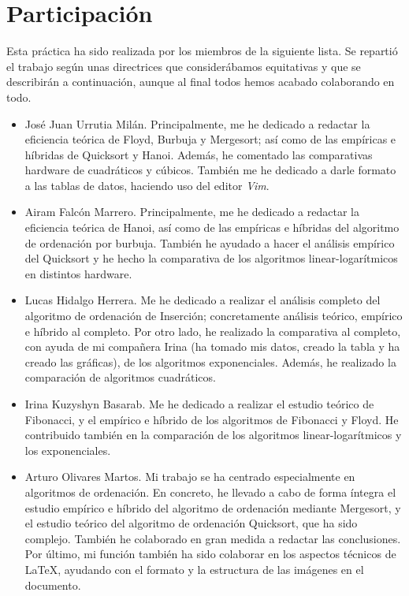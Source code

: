 \documentclass[12pt]{article}
\begin{document}
    \section{Participación}
    Esta práctica ha sido realizada por los miembros de la siguiente lista. Se repartió el trabajo según unas directrices que considerábamos equitativas y que se describirán a continuación, aunque al final todos hemos acabado colaborando en todo.
    \begin{itemize}
        \item José Juan Urrutia Milán. Principalmente, me he dedicado a redactar la eficiencia teórica de Floyd, Burbuja y Mergesort; así como de las empíricas e híbridas de Quicksort y Hanoi. Además, he comentado las comparativas hardware de cuadráticos y cúbicos.
        También me he dedicado a darle formato a las tablas de datos, haciendo uso del editor \emph{Vim}.
        \item Airam Falcón Marrero. Principalmente, me he dedicado a redactar la eficiencia teórica de Hanoi, así como de las empíricas e híbridas del algoritmo de ordenación por burbuja. También he ayudado a hacer el análisis empírico del Quicksort y he hecho la comparativa de los algoritmos linear-logarítmicos en distintos hardware.
        \item Lucas Hidalgo Herrera. Me he dedicado a realizar el análisis completo del algoritmo de ordenación de Inserción; concretamente análisis teórico, empírico e híbrido al completo. Por otro lado, he realizado la comparativa al completo, con ayuda de mi compañera Irina (ha tomado mis datos, creado la tabla y ha creado las gráficas), de los algoritmos exponenciales. Además, he realizado la comparación de algoritmos cuadráticos.
        \item Irina Kuzyshyn Basarab. Me he dedicado a realizar el estudio teórico de Fibonacci, y el empírico e híbrido de los algoritmos de Fibonacci y Floyd. He contribuido también en la comparación de los algoritmos linear-logarítmicos y los exponenciales. 
        \item Arturo Olivares Martos. Mi trabajo se ha centrado especialmente en algoritmos de ordenación. En concreto, he llevado a cabo de forma íntegra el estudio empírico e híbrido del algoritmo de ordenación mediante Mergesort, y el estudio teórico del algoritmo de ordenación Quicksort, que ha sido complejo. También he colaborado en gran medida a redactar las conclusiones. Por último, mi función también ha sido colaborar en los aspectos técnicos de \LaTeX, ayudando con el formato y la estructura de las imágenes en el documento.
    \end{itemize}
    
\end{document}
